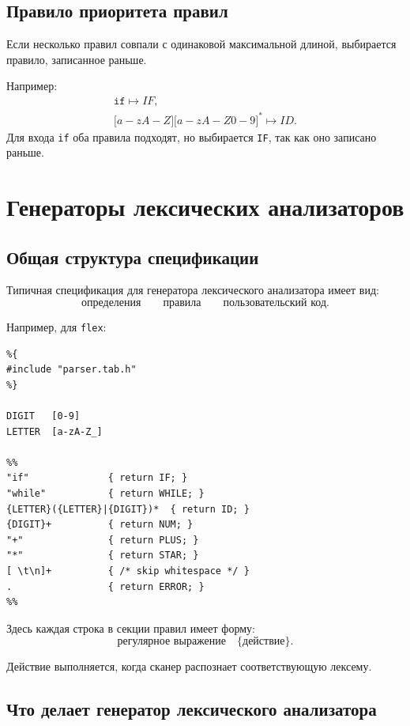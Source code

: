 \documentclass[12pt,a4paper]{article}
\begin{document}
\subsection{Правило приоритета правил}

Если несколько правил совпали с одинаковой максимальной длиной, выбирается правило, записанное раньше.

Например:
\[
\begin{array}{l}
\texttt{if} \mapsto IF,\\
\lbrack a-zA-Z \rbrack \lbrack a-zA-Z0-9 \rbrack ^* \mapsto ID.
\end{array}
\]
Для входа \texttt{if} оба правила подходят, но выбирается \texttt{IF}, так как оно записано раньше.

\section{Генераторы лексических анализаторов}

\subsection{Общая структура спецификации}

Типичная спецификация для генератора лексического анализатора имеет вид:
\[
\text{определения}
\quad
\quad
\text{правила}
\quad
\quad
\text{пользовательский код}.
\]

Например, для \texttt{flex}:

\begin{lstlisting}
%{
#include "parser.tab.h"
%}

DIGIT   [0-9]
LETTER  [a-zA-Z_]

%%
"if"              { return IF; }
"while"           { return WHILE; }
{LETTER}({LETTER}|{DIGIT})*  { return ID; }
{DIGIT}+          { return NUM; }
"+"               { return PLUS; }
"*"               { return STAR; }
[ \t\n]+          { /* skip whitespace */ }
.                 { return ERROR; }
%%
\end{lstlisting}

Здесь каждая строка в секции правил имеет форму:
\[
\text{регулярное выражение}\quad \{\text{действие}\}.
\]

Действие выполняется, когда сканер распознает соответствующую лексему.

\subsection{Что делает генератор лексического анализатора}
\end{document}
